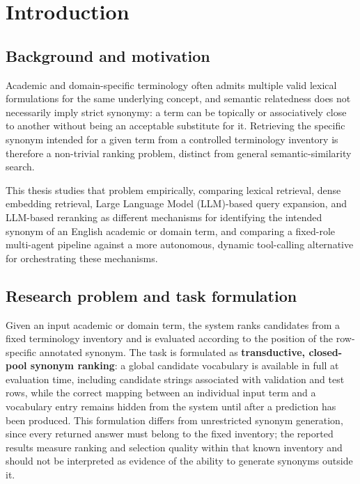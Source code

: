\chapter{Introduction}

\section{Background and motivation}

Academic and domain-specific terminology often admits multiple valid lexical formulations for the same underlying concept, and semantic relatedness does not necessarily imply strict synonymy: a term can be topically or associatively close to another without being an acceptable substitute for it. Retrieving the specific synonym intended for a given term from a controlled terminology inventory is therefore a non-trivial ranking problem, distinct from general semantic-similarity search.

This thesis studies that problem empirically, comparing lexical retrieval, dense embedding retrieval, Large Language Model (LLM)-based query expansion, and LLM-based reranking as different mechanisms for identifying the intended synonym of an English academic or domain term, and comparing a fixed-role multi-agent pipeline against a more autonomous, dynamic tool-calling alternative for orchestrating these mechanisms.

\section{Research problem and task formulation}

Given an input academic or domain term, the system ranks candidates from a fixed terminology inventory and is evaluated according to the position of the row-specific annotated synonym. The task is formulated as \textbf{transductive, closed-pool synonym ranking}: a global candidate vocabulary is available in full at evaluation time, including candidate strings associated with validation and test rows, while the correct mapping between an individual input term and a vocabulary entry remains hidden from the system until after a prediction has been produced. This formulation differs from unrestricted synonym generation, since every returned answer must belong to the fixed inventory; the reported results measure ranking and selection quality within that known inventory and should not be interpreted as evidence of the ability to generate synonyms outside it.

